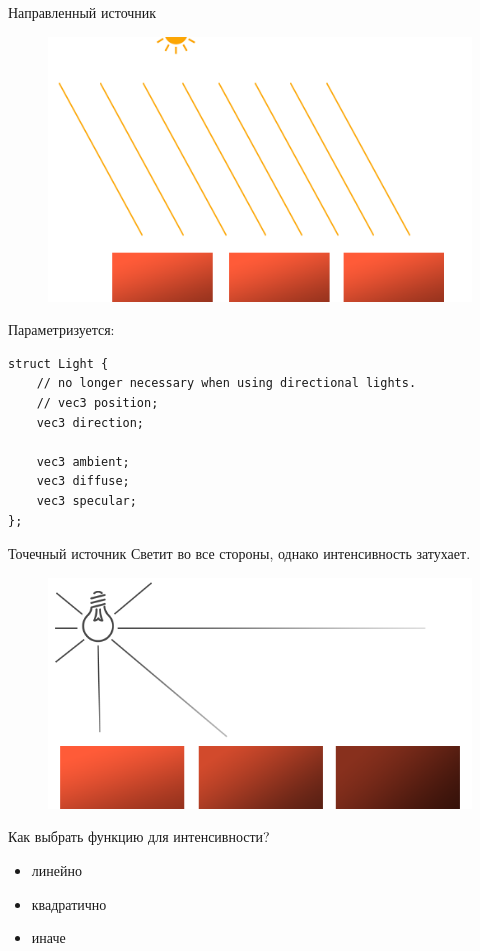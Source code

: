 \documentclass[aspectration=1610,t]{beamer}
\begin{document}
\begin{frame}[fragile]{Направленный источник}
    \begin{figure}[htp]
        \centering
        \includegraphics[scale=0.20]{res/directional}
    \end{figure}
    Параметризуется:
    {\small \begin{lstlisting}
struct Light {
    // no longer necessary when using directional lights.
    // vec3 position;
    vec3 direction;
    
    vec3 ambient;
    vec3 diffuse;
    vec3 specular;
};
    \end{lstlisting}}
\end{frame}

\begin{frame}[fragile]{Точечный источник}
    Светит во все стороны, однако интенсивность затухает.
    \begin{figure}[htp]
        \centering
        \includegraphics[scale=0.2]{res/point}
    \end{figure}
    Как выбрать функцию для интенсивности?
    \begin{itemize}
        \item линейно
        \item квадратично
        \item иначе
    \end{itemize}
\end{frame}
\end{document}
